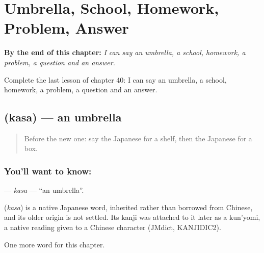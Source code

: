 
\chapter{Umbrella, School, Homework, Problem, Answer}
\label{ch:ja-umbrella-school-homework-problem-answer}

\begin{chapteropening}
\textbf{By the end of this chapter:} \emph{I can say an umbrella, a school, homework, a problem, a question and an answer.}

Complete the last lesson of chapter 40: I can say an umbrella, a school, homework, a problem, a question and an answer.
\end{chapteropening}

\section[\texorpdfstring{\ja{かさ} (kasa)}{かさ (kasa)}]{ (kasa) — an umbrella}

\label{lesson:JA-C40-kasa}



\begin{quote}
Before the new one: say the Japanese for a shelf, then the Japanese for a box.
\end{quote}

\subsection*{You'll want to know: }
\textbf{} — \emph{kasa} — \textquotedblleft{}an umbrella\textquotedblright{}.

\begin{cousinweb}
\textbf{} (\emph{kasa}) is a native Japanese word, inherited rather than borrowed from Chinese, and its older origin is not settled. Its kanji was attached to it later as a kun'yomi, a native reading given to a Chinese character (JMdict, KANJIDIC2).
\end{cousinweb}

\begin{grammarlens}[title={What you've built}]
One more word for this chapter.
\end{grammarlens}

